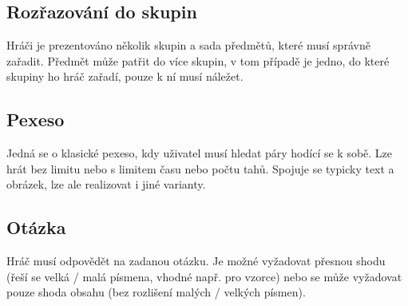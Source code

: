 \documentclass[a4paper,12pt]{article}
\begin{document}
\subsection{Rozřazování do skupin}
Hráči je prezentováno několik skupin a sada předmětů, které musí správně zařadit. Předmět může patřit do více skupin, v tom případě je jedno, do které skupiny ho hráč zařadí, pouze k ní musí náležet.
\begin{figure}[H]
\end{figure}
\subsection{Pexeso}
Jedná se o klasické pexeso, kdy uživatel musí hledat páry hodící se k sobě. Lze hrát bez limitu nebo s limitem času nebo počtu tahů. Spojuje se typicky text a obrázek, lze ale realizovat i jiné varianty.
\begin{figure}[H]
\end{figure}
\subsection{Otázka}
Hráč musí odpovědět na zadanou otázku. Je možné vyžadovat přesnou shodu (řeší se velká / malá písmena, vhodné např. pro vzorce) nebo se může vyžadovat pouze shoda obsahu (bez rozlišení malých / velkých písmen).
\end{document}
